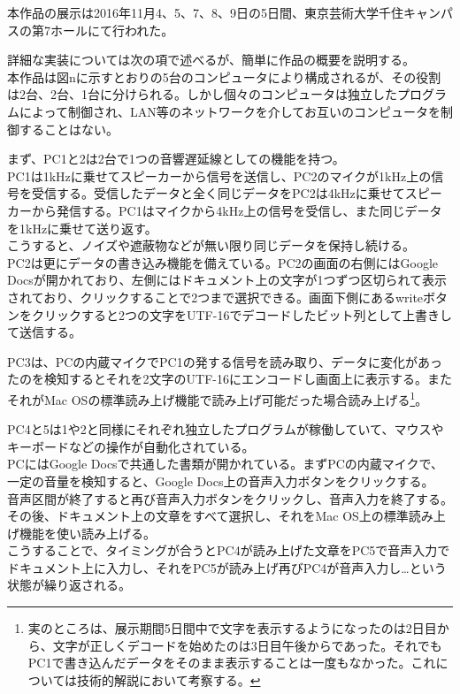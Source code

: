 本作品の展示は2016年11月4、5、7、8、9日の5日間、東京芸術大学千住キャンパスの第7ホールにて行われた。

詳細な実装については次の項で述べるが、簡単に作品の概要を説明する。\\
本作品は図nに示すとおりの5台のコンピュータにより構成されるが、その役割は2台、2台、1台に分けられる。しかし個々のコンピュータは独立したプログラムによって制御され、LAN等のネットワークを介してお互いのコンピュータを制御することはない。

まず、PC1と2は2台で1つの音響遅延線としての機能を持つ。\\
PC1は1kHzに乗せてスピーカーから信号を送信し、PC2のマイクが1kHz上の信号を受信する。受信したデータと全く同じデータをPC2は4kHzに乗せてスピーカーから発信する。PC1はマイクから4kHz上の信号を受信し、また同じデータを1kHzに乗せて送り返す。\\
こうすると、ノイズや遮蔽物などが無い限り同じデータを保持し続ける。\\
PC2は更にデータの書き込み機能を備えている。PC2の画面の右側にはGoogle
Docsが開かれており、左側にはドキュメント上の文字が1つずつ区切られて表示されており、クリックすることで2つまで選択できる。画面下側にあるwriteボタンをクリックすると2つの文字をUTF-16でデコードしたビット列として上書きして送信する。

PC3は、PCの内蔵マイクでPC1の発する信号を読み取り、データに変化があったのを検知するとそれを2文字のUTF-16にエンコードし画面上に表示する。またそれがMac
OSの標準読み上げ機能で読み上げ可能だった場合読み上げる\footnote{実のところは、展示期間5日間中で文字を表示するようになったのは2日目から、文字が正しくデコードを始めたのは3日目午後からであった。それでもPC1で書き込んだデータをそのまま表示することは一度もなかった。これについては技術的解説において考察する。}。

PC4と5は1や2と同様にそれぞれ独立したプログラムが稼働していて、マウスやキーボードなどの操作が自動化されている。\\
PCにはGoogle
Docsで共通した書類が開かれている。まずPCの内蔵マイクで、一定の音量を検知すると、Google
Docs上の音声入力ボタンをクリックする。\\
音声区間が終了すると再び音声入力ボタンをクリックし、音声入力を終了する。その後、ドキュメント上の文章をすべて選択し、それをMac
OS上の標準読み上げ機能を使い読み上げる。\\
こうすることで、タイミングが合うとPC4が読み上げた文章をPC5で音声入力でドキュメント上に入力し、それをPC5が読み上げ再びPC4が音声入力し\ldots{}という状態が繰り返される。

